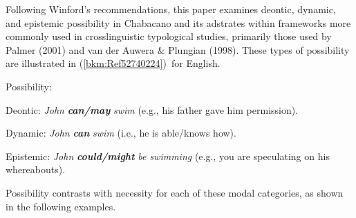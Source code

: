 \begin{styleStandard}
Following Winford’s recommendations, this paper examines deontic, dynamic, and epistemic possibility in Chabacano and its adstrates within frameworks more commonly used in crosslinguistic typological studies, primarily those used by Palmer (2001) and van der Auwera \& Plungian (1998). These types of possibility are illustrated in (\ref{bkm:Ref52740224})\ for English.
\end{styleStandard}


\setcounter{listWWNumiileveli}{0}
\begin{listWWNumiileveli}
\item 
\begin{stylelsLanginfo}
\label{bkm:Ref52740224}Possibility:
\end{stylelsLanginfo}


\setcounter{listWWNumiilevelii}{0}
\begin{listWWNumiilevelii}
\item 
\begin{stylelsLanginfo}
Deontic: \textit{John }\textbf{\textit{can/may}}\textit{ swim} (e.g., his father gave him permission).
\end{stylelsLanginfo}
\item 
\begin{stylelsLanginfo}
Dynamic: \textit{John }\textbf{\textit{can}}\textit{ swim} (i.e., he is able/knows how).
\end{stylelsLanginfo}
\item 
\begin{stylelsLanginfo}
Epistemic: \textit{John }\textbf{\textit{could/might}}\textit{ be swimming} (e.g., you are speculating on his whereabouts).
\end{stylelsLanginfo}
\end{listWWNumiilevelii}
\end{listWWNumiileveli}
\begin{styleStandard}
Possibility contrasts with necessity for each of these modal categories, as shown in the following examples.
\end{styleStandard}

